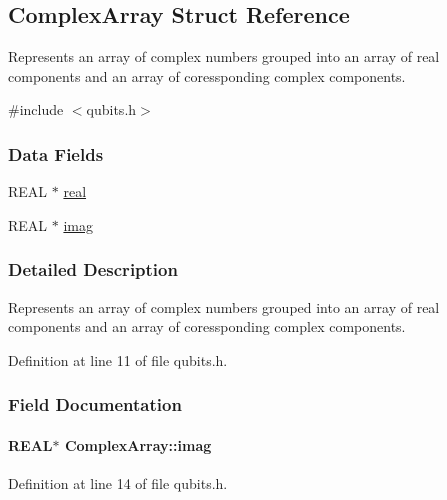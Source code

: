 \hypertarget{structComplexArray}{
\subsection{ComplexArray Struct Reference}
\label{structComplexArray}
}


Represents an array of complex numbers grouped into an array of real components and an array of coressponding complex components.  


{\ttfamily \#include $<$qubits.h$>$}\subsubsection*{Data Fields}
\begin{DoxyCompactItemize}
\item 
REAL $\ast$ \hyperlink{structComplexArray_a4195cac6c784ea1b6271f1c7dba1548a}{real}
\item 
REAL $\ast$ \hyperlink{structComplexArray_a79dde47c7ae530c79cebfdf57b225968}{imag}
\end{DoxyCompactItemize}


\subsubsection{Detailed Description}
Represents an array of complex numbers grouped into an array of real components and an array of coressponding complex components. 

Definition at line 11 of file qubits.h.

\subsubsection{Field Documentation}
\hypertarget{structComplexArray_a79dde47c7ae530c79cebfdf57b225968}{
\paragraph[{imag}]{\setlength{\rightskip}{0pt plus 5cm}REAL$\ast$ {\bf ComplexArray::imag}}\hfill}
\label{structComplexArray_a79dde47c7ae530c79cebfdf57b225968}


Definition at line 14 of file qubits.h.

